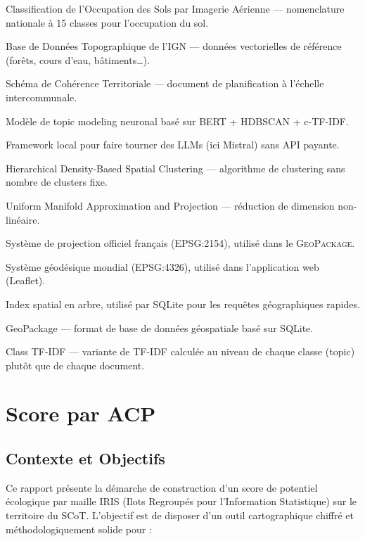 \documentclass[12pt,a4paper]{report}
\newcommand{\gpkg}{\textsc{GeoPackage}}
\newcommand{\cosia}{\textsc{COSIA}}
\newcommand{\bdtopo}{\textsc{BD TOPO}}
\newcommand{\scot}{\textsc{SCoT}}
\begin{document}
\begin{description}[leftmargin=3cm, style=nextline]
  \item[\cosia{}] Classification de l'Occupation des Sols par Imagerie Aérienne — nomenclature nationale à 15 classes pour l'occupation du sol.
  \item[\bdtopo{}] Base de Données Topographique de l'IGN — données vectorielles de référence (forêts, cours d'eau, bâtiments…).
  \item[\scot{}] Schéma de Cohérence Territoriale — document de planification à l'échelle intercommunale.
  \item[BERTopic] Modèle de topic modeling neuronal basé sur BERT + HDBSCAN + c-TF-IDF.
  \item[Ollama] Framework local pour faire tourner des LLMs (ici Mistral) sans API payante.
  \item[HDBSCAN] Hierarchical Density-Based Spatial Clustering — algorithme de clustering sans nombre de clusters fixe.
  \item[UMAP] Uniform Manifold Approximation and Projection — réduction de dimension non-linéaire.
  \item[Lambert 93] Système de projection officiel français (EPSG:2154), utilisé dans le \gpkg{}.
  \item[WGS84] Système géodésique mondial (EPSG:4326), utilisé dans l'application web (Leaflet).
  \item[R-Tree] Index spatial en arbre, utilisé par SQLite pour les requêtes géographiques rapides.
  \item[\gpkg{}] GeoPackage — format de base de données géospatiale basé sur SQLite.
  \item[c-TF-IDF] Class TF-IDF — variante de TF-IDF calculée au niveau de chaque classe (topic) plutôt que de chaque document.
\end{description}

\chapter{Score par ACP}
\section{Contexte et Objectifs}

Ce rapport présente la démarche de construction d'un score de potentiel écologique par maille IRIS (Ilots Regroupés pour l'Information Statistique) sur le territoire du SCoT. L'objectif est de disposer d'un outil cartographique chiffré et méthodologiquement solide pour :
\end{document}
